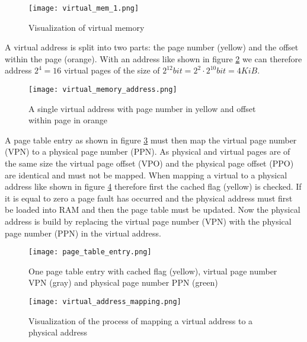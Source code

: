 \begin{figure}[h]
    \centering
    \texttt{[image: virtual\_mem\_1.png]}
    \caption{Visualization of virtual memory}
    \label{fig:virtual_memory}
\end{figure}

A virtual address is split into two parts: the page number (yellow) and the offset within the page (orange). With an address like shown in figure \ref{fig:virtual_memory_address} we can therefore address $2^{4} = 16$ virtual pages of the size of $2^{12} bit= 2^{2} \cdot 2^{10} bit = 4 KiB$.

            \begin{figure}[h]
                \centering
                \texttt{[image: virtual\_memory\_address.png]}
                \caption{A single virtual address with page number in yellow and offset within page in orange}
                \label{fig:virtual_memory_address}
            \end{figure}

            A page table entry as shown in figure \ref{fig:page_table_entry} must then map the virtual page number (VPN) to a physical page number (PPN). As physical and virtual pages are of the same size the virtual page offset (VPO) and the physical page offset (PPO) are identical and must not be mapped. When mapping a virtual to a physical address like shown in figure \ref{fig:virtual_address_mapping} therefore first the cached flag (yellow) is checked. If it is equal to zero a page fault has occurred and the physical address must first be loaded into RAM and then the page table must be updated. Now the physical address is build by replacing the virtual page number (VPN) with the physical page number (PPN) in the virtual address.

            \begin{figure}[h]
                \centering
                \texttt{[image: page\_table\_entry.png]}
                \caption{One page table entry with cached flag (yellow), virtual page number VPN (gray) and physical page number PPN (green)}
                \label{fig:page_table_entry}
            \end{figure}

            \begin{figure}[h]
                \centering
                \texttt{[image: virtual\_address\_mapping.png]}
                \caption{Visualization of the process of mapping a virtual address to a physical address}
                \label{fig:virtual_address_mapping}
            \end{figure}


